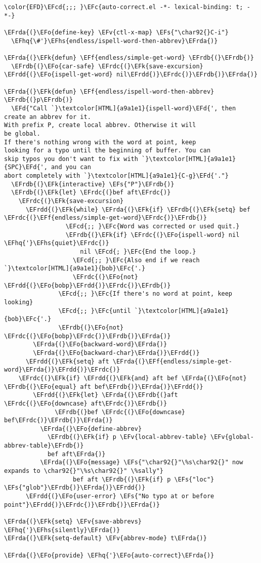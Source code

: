 \documentclass[a4wide,10pt]{article}
\newcommand{\EFc}[1]{\textcolor{EFc}{#1}} %
\newcommand{\EFcd}[1]{\textcolor{EFcd}{#1}} %
\newcommand{\EFs}[1]{\textcolor{EFs}{#1}} %
\newcommand{\EFd}[1]{\textcolor{EFd}{#1}} %
\newcommand{\EFk}[1]{\textcolor{EFk}{#1}} %
\newcommand{\EFf}[1]{\textcolor{EFf}{#1}} %
\newcommand{\EFv}[1]{\textcolor{EFv}{#1}} %
\newcommand{\EFo}[1]{\textcolor{EFo}{#1}} %
\newcommand{\EFhq}[1]{\textcolor{EFhq}{#1}} %
\newcommand{\EFhs}[1]{\textcolor{EFhs}{#1}} %
\newcommand{\EFrda}[1]{\textcolor{EFrda}{#1}} %
\newcommand{\EFrdb}[1]{\textcolor{EFrdb}{#1}} %
\newcommand{\EFrdc}[1]{\textcolor{EFrdc}{#1}} %
\newcommand{\EFrdd}[1]{\textcolor{EFrdd}{#1}} %
\begin{document}
\begin{Code}
\begin{Verbatim}
\color{EFD}\EFcd{;;; }\EFc{auto-correct.el -*- lexical-binding: t; -*-}

\EFrda{(}\EFo{define-key} \EFv{ctl-x-map} \EFs{"\char92{}C-i"}
  \EFhq{\#'}\EFhs{endless/ispell-word-then-abbrev}\EFrda{)}

\EFrda{(}\EFk{defun} \EFf{endless/simple-get-word} \EFrdb{(}\EFrdb{)}
  \EFrdb{(}\EFo{car-safe} \EFrdc{(}\EFk{save-excursion} \EFrdd{(}\EFo{ispell-get-word} nil\EFrdd{)}\EFrdc{)}\EFrdb{)}\EFrda{)}

\EFrda{(}\EFk{defun} \EFf{endless/ispell-word-then-abbrev} \EFrdb{(}p\EFrdb{)}
  \EFd{"Call `}\textcolor[HTML]{a9a1e1}{ispell-word}\EFd{', then create an abbrev for it.
With prefix P, create local abbrev. Otherwise it will
be global.
If there's nothing wrong with the word at point, keep
looking for a typo until the beginning of buffer. You can
skip typos you don't want to fix with `}\textcolor[HTML]{a9a1e1}{SPC}\EFd{', and you can
abort completely with `}\textcolor[HTML]{a9a1e1}{C-g}\EFd{'."}
  \EFrdb{(}\EFk{interactive} \EFs{"P"}\EFrdb{)}
  \EFrdb{(}\EFk{let} \EFrdc{(}bef aft\EFrdc{)}
    \EFrdc{(}\EFk{save-excursion}
      \EFrdd{(}\EFk{while} \EFrda{(}\EFk{if} \EFrdb{(}\EFk{setq} bef \EFrdc{(}\EFf{endless/simple-get-word}\EFrdc{)}\EFrdb{)}
                 \EFcd{;; }\EFc{Word was corrected or used quit.}
                 \EFrdb{(}\EFk{if} \EFrdc{(}\EFo{ispell-word} nil \EFhq{'}\EFhs{quiet}\EFrdc{)}
                     nil \EFcd{; }\EFc{End the loop.}
                   \EFcd{;; }\EFc{Also end if we reach `}\textcolor[HTML]{a9a1e1}{bob}\EFc{'.}
                   \EFrdc{(}\EFo{not} \EFrdd{(}\EFo{bobp}\EFrdd{)}\EFrdc{)}\EFrdb{)}
               \EFcd{;; }\EFc{If there's no word at point, keep looking}
               \EFcd{;; }\EFc{until `}\textcolor[HTML]{a9a1e1}{bob}\EFc{'.}
               \EFrdb{(}\EFo{not} \EFrdc{(}\EFo{bobp}\EFrdc{)}\EFrdb{)}\EFrda{)}
        \EFrda{(}\EFo{backward-word}\EFrda{)}
        \EFrda{(}\EFo{backward-char}\EFrda{)}\EFrdd{)}
      \EFrdd{(}\EFk{setq} aft \EFrda{(}\EFf{endless/simple-get-word}\EFrda{)}\EFrdd{)}\EFrdc{)}
    \EFrdc{(}\EFk{if} \EFrdd{(}\EFk{and} aft bef \EFrda{(}\EFo{not} \EFrdb{(}\EFo{equal} aft bef\EFrdb{)}\EFrda{)}\EFrdd{)}
        \EFrdd{(}\EFk{let} \EFrda{(}\EFrdb{(}aft \EFrdc{(}\EFo{downcase} aft\EFrdc{)}\EFrdb{)}
              \EFrdb{(}bef \EFrdc{(}\EFo{downcase} bef\EFrdc{)}\EFrdb{)}\EFrda{)}
          \EFrda{(}\EFo{define-abbrev}
            \EFrdb{(}\EFk{if} p \EFv{local-abbrev-table} \EFv{global-abbrev-table}\EFrdb{)}
            bef aft\EFrda{)}
          \EFrda{(}\EFo{message} \EFs{"\char92{}"\%s\char92{}" now expands to \char92{}"\%s\char92{}" \%sally"}
                   bef aft \EFrdb{(}\EFk{if} p \EFs{"loc"} \EFs{"glob"}\EFrdb{)}\EFrda{)}\EFrdd{)}
      \EFrdd{(}\EFo{user-error} \EFs{"No typo at or before point"}\EFrdd{)}\EFrdc{)}\EFrdb{)}\EFrda{)}

\EFrda{(}\EFk{setq} \EFv{save-abbrevs} \EFhq{'}\EFhs{silently}\EFrda{)}
\EFrda{(}\EFk{setq-default} \EFv{abbrev-mode} t\EFrda{)}

\EFrda{(}\EFo{provide} \EFhq{'}\EFo{auto-correct}\EFrda{)}
\end{Verbatim}
\end{Code}
\end{document}
